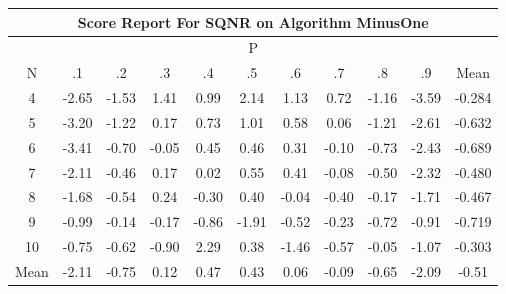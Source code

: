 \documentclass[11pt,a4paper]{report}
\begin{document}
\begin{longtable}{ | c || c | c | c | c | c | c | c | c | c || c |}
\hline
\multicolumn{11}{|c|}{ Score Report For SQNR on Algorithm MinusOne} \\
\hline
\multicolumn{11}{|c|}{ P } \\
\hline
N & .1 & .2 & .3 & .4 & .5 & .6 & .7 & .8 & .9 & Mean\\
 \hline
 \hline
 \endhead
  4 &  \cellcolor[HTML]{FFBFBF} -2.65 &  \cellcolor[HTML]{FFD7D7} -1.53 &  \cellcolor[HTML]{DFDFFF} 1.41 &  \cellcolor[HTML]{E7E7FF} 0.99 &  \cellcolor[HTML]{C7C7FF} 2.14 &  \cellcolor[HTML]{DFDFFF} 1.13 &  \cellcolor[HTML]{EFEFFF} 0.72 &  \cellcolor[HTML]{FFDFDF} -1.16 &  \cellcolor[HTML]{FFA7A7} -3.59 & -0.284 \\
  5 &  \cellcolor[HTML]{FFAFAF} -3.20 &  \cellcolor[HTML]{FFDFDF} -1.22 &  \cellcolor[HTML]{F7F7FF} 0.17 &  \cellcolor[HTML]{EFEFFF} 0.73 &  \cellcolor[HTML]{E7E7FF} 1.01 &  \cellcolor[HTML]{EFEFFF} 0.58 &  \cellcolor[HTML]{FFFFFF} 0.06 &  \cellcolor[HTML]{FFDFDF} -1.21 &  \cellcolor[HTML]{FFBFBF} -2.61 & -0.632 \\
  6 &  \cellcolor[HTML]{FFA7A7} -3.41 &  \cellcolor[HTML]{FFEFEF} -0.70 &  \cellcolor[HTML]{FFFFFF} -0.05 &  \cellcolor[HTML]{F7F7FF} 0.45 &  \cellcolor[HTML]{F7F7FF} 0.46 &  \cellcolor[HTML]{F7F7FF} 0.31 &  \cellcolor[HTML]{FFFFFF} -0.10 &  \cellcolor[HTML]{FFEFEF} -0.73 &  \cellcolor[HTML]{FFBFBF} -2.43 & -0.689 \\
  7 &  \cellcolor[HTML]{FFC7C7} -2.11 &  \cellcolor[HTML]{FFF7F7} -0.46 &  \cellcolor[HTML]{F7F7FF} 0.17 &  \cellcolor[HTML]{FFFFFF} 0.02 &  \cellcolor[HTML]{EFEFFF} 0.55 &  \cellcolor[HTML]{F7F7FF} 0.41 &  \cellcolor[HTML]{FFFFFF} -0.08 &  \cellcolor[HTML]{FFEFEF} -0.50 &  \cellcolor[HTML]{FFC7C7} -2.32 & -0.480 \\
  8 &  \cellcolor[HTML]{FFD7D7} -1.68 &  \cellcolor[HTML]{FFEFEF} -0.54 &  \cellcolor[HTML]{F7F7FF} 0.24 &  \cellcolor[HTML]{FFF7F7} -0.30 &  \cellcolor[HTML]{F7F7FF} 0.40 &  \cellcolor[HTML]{FFFFFF} -0.04 &  \cellcolor[HTML]{FFF7F7} -0.40 &  \cellcolor[HTML]{FFF7F7} -0.17 &  \cellcolor[HTML]{FFD7D7} -1.71 & -0.467 \\
  9 &  \cellcolor[HTML]{FFE7E7} -0.99 &  \cellcolor[HTML]{FFFFFF} -0.14 &  \cellcolor[HTML]{FFF7F7} -0.17 &  \cellcolor[HTML]{FFE7E7} -0.86 &  \cellcolor[HTML]{FFCFCF} -1.91 &  \cellcolor[HTML]{FFEFEF} -0.52 &  \cellcolor[HTML]{FFF7F7} -0.23 &  \cellcolor[HTML]{FFEFEF} -0.72 &  \cellcolor[HTML]{FFE7E7} -0.91 & -0.719 \\
  10 &  \cellcolor[HTML]{FFEFEF} -0.75 &  \cellcolor[HTML]{FFEFEF} -0.62 &  \cellcolor[HTML]{FFE7E7} -0.90 &  \cellcolor[HTML]{C7C7FF} 2.29 &  \cellcolor[HTML]{F7F7FF} 0.38 &  \cellcolor[HTML]{FFD7D7} -1.46 &  \cellcolor[HTML]{FFEFEF} -0.57 &  \cellcolor[HTML]{FFFFFF} -0.05 &  \cellcolor[HTML]{FFE7E7} -1.07 & -0.303 \\
 \hline
 \hline
Mean &  \cellcolor[HTML]{FFC7C7} -2.11 &  \cellcolor[HTML]{FFEFEF} -0.75 &  \cellcolor[HTML]{FFFFFF} 0.12 &  \cellcolor[HTML]{F7F7FF} 0.47 &  \cellcolor[HTML]{F7F7FF} 0.43 &  \cellcolor[HTML]{FFFFFF} 0.06 &  \cellcolor[HTML]{FFFFFF} -0.09 &  \cellcolor[HTML]{FFEFEF} -0.65 &  \cellcolor[HTML]{FFC7C7} -2.09 &  \cellcolor[HTML]{FFEFEF} -0.51
\end{longtable}
\end{document}
